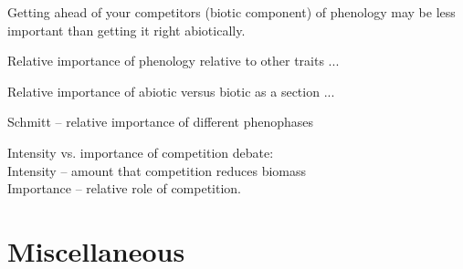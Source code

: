 \documentclass[11pt,letter]{article}
\begin{document}
Getting ahead of your competitors (biotic component) of phenology may be less important than getting it right abiotically.

Relative importance of phenology relative to other traits ... 

Relative importance of abiotic versus biotic as a section ... 

Schmitt -- relative importance of different phenophases

Intensity vs. importance of competition debate: \\
Intensity -- amount that competition reduces biomass\\
Importance -- relative role of competition. 

\section{Miscellaneous}
\end{document}
